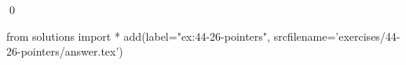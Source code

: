 
\begin{ex}
  \label{ex:44-26-pointers}
  
  \qed
\end{ex}
\begin{python0}
from solutions import *
add(label="ex:44-26-pointers",
    srcfilename='exercises/44-26-pointers/answer.tex')
\end{python0}
